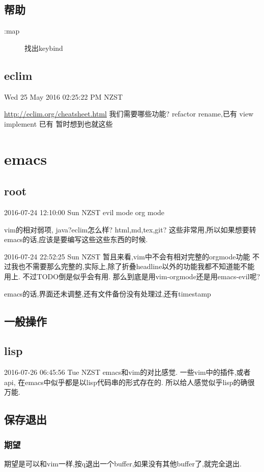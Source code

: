\documentclass[12pt,a4paper]{article}
\begin{document}
\subsection{帮助}
\label{sec:orgheadline7}
\begin{description}
\item[{:map}] 找出keybind
\end{description}
\subsection{eclim}
\label{sec:orgheadline8}
Wed 25 May 2016 02:25:22 PM NZST

\url{http://eclim.org/cheatsheet.html}
我们需要哪些功能?
refactor rename,已有
view implement 已有
暂时想到也就这些
\section{emacs}
\label{sec:orgheadline27}
\subsection{root}
\label{sec:orgheadline10}
2016-07-24 12:10:00 Sun NZST
evil mode
org mode

vim的相对弱项,
java?eclim怎么样?
html,md,tex,git?
这些非常用,所以如果想要转emacs的话,应该是要编写这些这些东西的时候.

2016-07-24 22:52:25 Sun NZST
暂且来看,vim中不会有相对完整的orgmode功能
不过我也不需要那么完整的,实际上,除了折叠headline以外的功能我都不知道能不能用上.
不过TODO倒是似乎会有用.
那么到底是用vim-orgmode还是用emacs-evil呢?

emacs的话,界面还未调整,还有文件备份没有处理过,还有timestamp

\subsection{一般操作}
\label{sec:orgheadline11}
\subsection{lisp}
\label{sec:orgheadline12}
   2016-07-26 06:45:56 Tue NZST
   emacs和vim的对比感觉.
一些vim中的插件,或者api,
在emacs中似乎都是以lisp代码串的形式存在的.
所以给人感觉似乎lisp的确很万能.
\subsection{保存退出}
\label{sec:orgheadline16}
\subsubsection{期望}
\label{sec:orgheadline13}
期望是可以和vim一样,按q退出一个buffer,如果没有其他buffer了,就完全退出.
\end{document}
